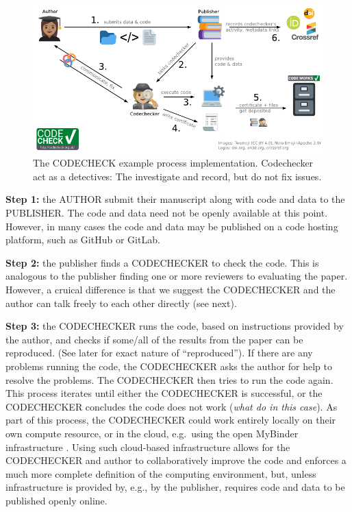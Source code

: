 \documentclass[12pt]{article}
\begin{document}

\begin{figure}
  \centering
      \includegraphics[width=\textwidth]{figs/codecheck_overview.pdf}
  \caption{The CODECHECK example process implementation. Codechecker act as a detectives:
  The investigate and record, but do not fix issues.}
  \label{fig:worfklow}
\end{figure}

\textbf{Step 1:} the AUTHOR submit their manuscript along with code and data to
the PUBLISHER. The code and data need not be openly available at this point.
However, in many cases the code and data may be published on a code hosting platform,
such as GitHub or GitLab.

\textbf{Step 2:} the publisher finds a CODECHECKER to check the code. This is
analogous to the publisher finding one or more reviewers to evaluating
the paper. However, a cruical difference is that we suggest the CODECHECKER
and the author can talk freely to each other directly (see next).

\textbf{Step 3:} the CODECHECKER runs the code, based on instructions provided by
the author, and checks if some/all of the results from the paper can be
reproduced. (See later for exact nature of ``reproduced''). If there are
any problems running the code, the CODECHECKER asks the author for help
to resolve the problems. The CODECHECKER then tries to run the code
again. This process iterates until either the CODECHECKER is successful,
or the CODECHECKER concludes the code does not work (\emph{what do in this
case}). As part of this process, the CODECHECKER could work entirely
locally on their own compute resource, or in the cloud, e.g.~using the open
MyBinder infrastructure \cite{jupyter_binder_2018}. Using such cloud-based 
infrastructure allows for the CODECHECKER and author to collaboratively improve
the code and enforces a much more complete definition of the computing environment,
but, unless infrastructure is provided by, e.g., by the publisher, requires code
and data to be published openly online.
\end{document}
